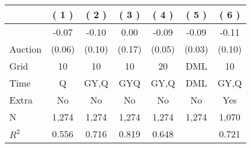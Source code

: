 
\begin{tabular}{lcccccc}
\toprule
 & ( 1 ) & ( 2 ) & ( 3 ) & ( 4 ) & ( 5 ) & ( 6 )\\
\midrule
 & -0.07 & -0.10 & 0.00 & -0.09 & -0.09 & -0.11\\

\multirow{-2}{*}{\raggedright\arraybackslash Auction} & (0.06) & (0.10) & (0.17) & (0.05) & (0.03) & (0.10)\\

\midrule
Grid & 10 & 10 & 10 & 20 & DML & 10\\

Time & Q & GY,Q & GYQ & GY,Q & DML & GY,Q\\

Extra & No & No & No & No & No & Yes\\

N & 1,274 & 1,274 & 1,274 & 1,274 & 1,274 & 1,070\\

$R^2$ & 0.556 & 0.716 & 0.819 & 0.648 &  & 0.721\\
\bottomrule
\end{tabular}
